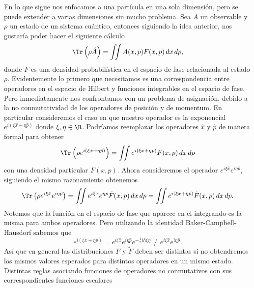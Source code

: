 En lo que sigue nos enfocamos a una partícula en una sola
  dimensión, pero se puede extender a varias dimensiones sin
  mucho problema. Sea $A$ un observable y $\rho$ un estado
  de un sistema cuántico, entonces siguiendo la idea
  anterior, nos gustaría poder hacer el siguiente cálculo
  \begin{equation}
    \Tr\left(\rho \hat{A}\right)
    = \iint A(x,p)F(x,p) \, dx \, dp,
  \end{equation}
  donde $F$ es una densidad probabilística en el espacio de
  fase relacionada al estado $\rho$. Evidentemente lo
  primero que necesitamos es una correspondencia entre
  operadores en el espacio de Hilbert y funciones
  integrables en el espacio de fase. Pero inmediatamente nos
  confrontamos con un problema de asignación, debido a la no
  conmutatividad de los operadores de posición y de
  momentum. En partícular consideremos el caso en que
  nuestro operador es la exponencial $e^{i(\xi \hat{x} +
  \eta \hat{p})}$ donde $\xi, \eta \in \R$.  Podríamos
  reemplazar los operadores $\hat{x}$ y $\hat{p}$ de manera
  formal para obtener
  \begin{equation}
    \Tr\left( \rho e^{i\left( \xi \hat{x} + \eta
    \hat{p} \right)} \right)
    = \iint e^{i\left( \xi x + \eta p \right)} F(x,p) \,
    dx \, dp
  \end{equation}
  con una densidad particular $F(x,p)$. Ahora consideremos
  el operador $e^{i\xi \hat{x}} e^{i\eta\hat{p}}$, siguiendo
  el mismo razonamiento obtenemos
  \begin{equation}
    \Tr\left(\rho e^{i\xi \hat{x}} e^{i\eta
    \hat{p}}\right)
    = \iint e^{i\xi x} e^{\eta p} \tilde F(x,p) \, dx \,
    dp
    = \iint e^{i\left( \xi x + \eta p \right)} \tilde
    F(x,p) \, dx \, dp.
  \end{equation}
  Notemos que la función en el espacio de fase que aparece
  en el integrando es la misma para ambos operadores. Pero
  utilizando la identidad Baker-Campbell-Hausdorf sabemos
  que
  \begin{equation}
    e^{i\left( \xi \hat{x} + \eta \hat{p} \right)}
    = e^{i\xi \hat{x}}e^{i\eta \hat{p}}e^{-\frac{1}{2}i\hbar
    \xi \eta}
    \neq e^{i\xi \hat{x}}e^{i\eta \hat{p}}.
  \end{equation}
  Así que en general las distribuciones $F$ y $\tilde F$
  deben ser distintas si no obtendremos los mismos valores
  esperados para distintos operadores en un mismo estado.
  Distintas reglas asociando funciones de operadores no
  conmutativos con sus correspondientes funciones escalares
